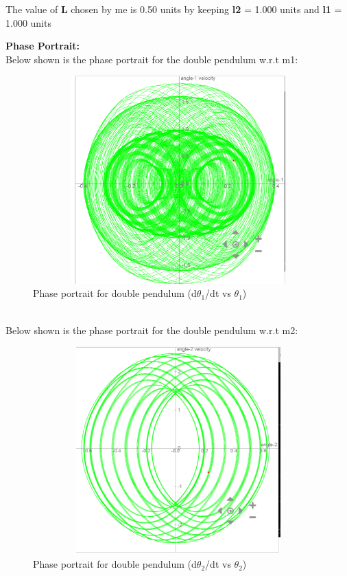 \documentclass[11pt]{scrartcl} %
\begin{document}
The value of \textbf{L} chosen by me is 0.50 units by keeping \textbf{l2} = 1.000 units and \textbf{l1} = 1.000 units

\textbf{Phase Portrait:}\\
Below shown is the phase portrait for the double pendulum w.r.t m1:
\begin{figure}[h] %
	\centering
	\includegraphics[width=12cm, height=8cm]{Figures/M 4b less than 1.png} %
	\caption{Phase portrait for double pendulum (d$\theta_{1}$/dt vs $\theta_{1}$)}
\end{figure}
\\
Below shown is the phase portrait for the double pendulum w.r.t m2:
\begin{figure}[h] %
	\centering
	\includegraphics[width=12cm, height=8cm]{Figures/M 4b less than 1 (2).png} %
	\caption{Phase portrait for double pendulum (d$\theta_{2}$/dt vs $\theta_{2}$)}
\end{figure}
\end{document}
